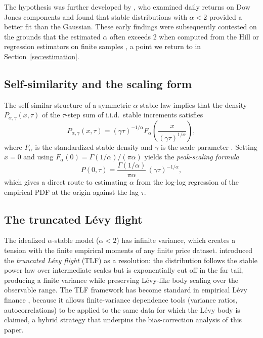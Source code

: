 \documentclass[12pt,a4paper]{article}
\begin{document}
The hypothesis was further developed by \textcite{Fama1965}, who examined
daily returns on Dow Jones components and found that stable distributions with
$\alpha < 2$ provided a better fit than the Gaussian. These early findings were
subsequently contested on the grounds that the estimated $\alpha$ often exceeds
2 when computed from the Hill or regression estimators on finite samples
\parencite{Weron2001}, a point we return to in Section~\ref{sec:estimation}.

\subsection{Self-similarity and the scaling form}

The self-similar structure of a symmetric $\alpha$-stable law implies that the
density $P_{\alpha,\gamma}(x,\tau)$ of the $\tau$-step sum of i.i.d.\ stable
increments satisfies
\begin{equation}
  P_{\alpha,\gamma}(x,\tau)
  = (\gamma\tau)^{-1/\alpha}
    F_\alpha\!\left(\frac{x}{(\gamma\tau)^{1/\alpha}}\right),
  \label{eq:scaling}
\end{equation}
where $F_\alpha$ is the standardized stable density and $\gamma$ is the scale
parameter \parencite{SamorodTaqqu1994}. Setting $x = 0$ and using
$F_\alpha(0) = \Gamma(1/\alpha)/(\pi\alpha)$ yields the \textit{peak-scaling
formula}
\begin{equation}
  P(0,\tau) = \frac{\Gamma(1/\alpha)}{\pi\alpha}\,(\gamma\tau)^{-1/\alpha},
  \label{eq:peak}
\end{equation}
which gives a direct route to estimating $\alpha$ from the log-log regression
of the empirical PDF at the origin against the lag $\tau$.

\subsection{The truncated Lévy flight}

The idealized $\alpha$-stable model ($\alpha < 2$) has infinite variance, which
creates a tension with the finite empirical moments of any finite price dataset.
\textcite{MantegnaStanley1994} introduced the \textit{truncated Lévy flight}
(TLF) as a resolution: the distribution follows the stable power law over
intermediate scales but is exponentially cut off in the far tail, producing a
finite variance while preserving Lévy-like body scaling over the observable
range. The TLF framework has become standard in empirical Lévy finance
\parencite{BouchaudPotters2003,Cont2001,Mantegna1991}, because it allows
finite-variance dependence tools (variance ratios, autocorrelations) to be
applied to the same data for which the Lévy body is claimed, a hybrid
strategy that underpins the bias-correction analysis of this paper.
\end{document}
